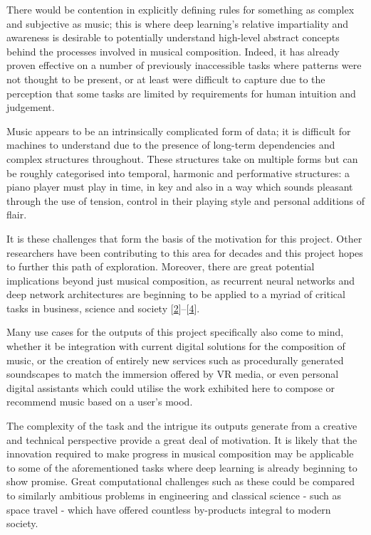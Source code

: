 \documentclass[12pt,]{article}
\begin{document}
There would be contention in explicitly defining rules for something as
complex and subjective as music; this is where deep learning's relative
impartiality and awareness is desirable to potentially understand
high-level abstract concepts behind the processes involved in musical
composition. Indeed, it has already proven effective on a number of
previously inaccessible tasks where patterns were not thought to be
present, or at least were difficult to capture due to the perception
that some tasks are limited by requirements for human intuition and
judgement.

Music appears to be an intrinsically complicated form of data; it is
difficult for machines to understand due to the presence of long-term
dependencies and complex structures throughout. These structures take on
multiple forms but can be roughly categorised into temporal, harmonic
and performative structures: a piano player must play in time, in key
and also in a way which sounds pleasant through the use of tension,
control in their playing style and personal additions of flair.

It is these challenges that form the basis of the motivation for this
project. Other researchers have been contributing to this area for
decades and this project hopes to further this path of exploration.
Moreover, there are great potential implications beyond just musical
composition, as recurrent neural networks and deep network architectures
are beginning to be applied to a myriad of critical tasks in business,
science and society
{[}\protect\hyperlink{ref-deng2014deep}{2}{]}--{[}\protect\hyperlink{ref-goodfellow2016deep}{4}{]}.

Many use cases for the outputs of this project specifically also come to
mind, whether it be integration with current digital solutions for the
composition of music, or the creation of entirely new services such as
procedurally generated soundscapes to match the immersion offered by VR
media, or even personal digital assistants which could utilise the work
exhibited here to compose or recommend music based on a user's mood.

The complexity of the task and the intrigue its outputs generate from a
creative and technical perspective provide a great deal of motivation.
It is likely that the innovation required to make progress in musical
composition may be applicable to some of the aforementioned tasks where
deep learning is already beginning to show promise. Great computational
challenges such as these could be compared to similarly ambitious
problems in engineering and classical science - such as space travel -
which have offered countless by-products integral to modern society.
\end{document}
